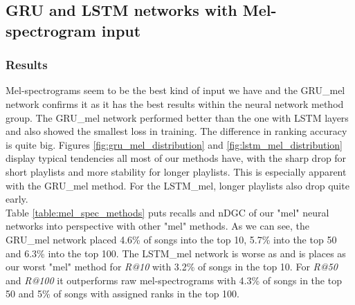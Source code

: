 \subsection{GRU and LSTM networks with Mel-spectrogram input}

\subsubsection{Results}
Mel-spectrograms seem to be the best kind of input we have and the GRU\_mel network confirms it as it has the best results within the neural network method group. The GRU\_mel network performed better than the one with LSTM layers and also showed the smallest loss in training. The difference in ranking accuracy is quite big. Figures \ref{fig:gru_mel_distribution} and \ref{fig:lstm_mel_distribution} display typical tendencies all most of our methods have, with the sharp drop for short playlists and more stability for longer playlists. This is especially apparent with the GRU\_mel method. For the LSTM\_mel, longer playlists also drop quite early. \\
Table \ref{table:mel_spec_methods} puts recalls and nDGC of our "mel" neural networks into perspective with other "mel" methods.
As we can see, the GRU\_mel network placed 4.6\% of songs into the top 10, 5.7\% into the top 50 and 6.3\% into the top 100. The LSTM\_mel network is worse as and is places as our worst "mel" method for \textit{R@10} with 3.2\% of songs in the top 10. For \textit{R@50} and \textit{R@100} it outperforms raw mel-spectrograms with 4.3\% of songs in the top 50 and 5\% of songs with assigned ranks in the top 100.

